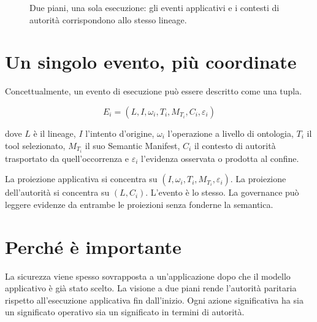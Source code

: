 \documentclass[10pt,oneside,openany]{book}
\begin{document}
\begin{figure}[ht]
\centering
{}
\caption{Due piani, una sola esecuzione: gli eventi applicativi e i contesti di autorità corrispondono allo stesso lineage.}
\end{figure}

\section{Un singolo evento, più coordinate}
Concettualmente, un evento di esecuzione può essere descritto come una tupla.
\begin{formulabox}
\[
E_i = (L, I, \omega_i, T_i, M_{T_i}, C_i, \varepsilon_i)
\]
\end{formulabox}
dove \(L\) è il lineage, \(I\) l'intento d'origine, \(\omega_i\) l'operazione a livello di ontologia, \(T_i\) il tool selezionato, \(M_{T_i}\) il suo Semantic Manifest, \(C_i\) il contesto di autorità trasportato da quell'occorrenza e \(\varepsilon_i\) l'evidenza osservata o prodotta al confine.

La proiezione applicativa si concentra su \((I,\omega_i,T_i,M_{T_i},\varepsilon_i)\). La proiezione dell'autorità si concentra su \((L,C_i)\). L'evento è lo stesso. La governance può leggere evidenze da entrambe le proiezioni senza fonderne la semantica.

\section{Perché è importante}
La sicurezza viene spesso sovrapposta a un'applicazione dopo che il modello applicativo è già stato scelto. La visione a due piani rende l'autorità paritaria rispetto all'esecuzione applicativa fin dall'inizio. Ogni azione significativa ha sia un significato operativo sia un significato in termini di autorità.
\end{document}
